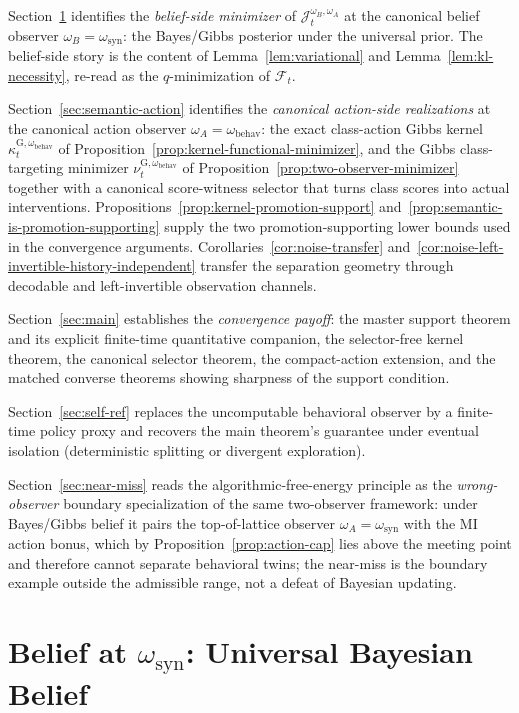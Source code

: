 \documentclass[11pt]{article}
\theoremstyle{definition}
\theoremstyle{remark}
\begin{document}
Section~\ref{sec:belief} identifies the \emph{belief-side minimizer} of $\mathcal J_t^{\omega_B,\omega_A}$ at the canonical belief observer $\omega_B=\omega_{\mathrm{syn}}$: the Bayes/Gibbs posterior under the universal prior. The belief-side story is the content of Lemma~\ref{lem:variational} and Lemma~\ref{lem:kl-necessity}, re-read as the $q$-minimization of $\mathcal F_t$.

Section~\ref{sec:semantic-action} identifies the \emph{canonical action-side realizations} at the canonical action observer $\omega_A=\omega_{\mathrm{behav}}$: the exact class-action Gibbs kernel $\kappa_t^{\mathrm G,\omega_{\mathrm{behav}}}$ of Proposition~\ref{prop:kernel-functional-minimizer}, and the Gibbs class-targeting minimizer $\nu_t^{\mathrm G,\omega_{\mathrm{behav}}}$ of Proposition~\ref{prop:two-observer-minimizer} together with a canonical score-witness selector that turns class scores into actual interventions. Propositions~\ref{prop:kernel-promotion-support} and~\ref{prop:semantic-is-promotion-supporting} supply the two promotion-supporting lower bounds used in the convergence arguments. Corollaries~\ref{cor:noise-transfer} and~\ref{cor:noise-left-invertible-history-independent} transfer the separation geometry through decodable and left-invertible observation channels.

Section~\ref{sec:main} establishes the \emph{convergence payoff}: the master support theorem and its explicit finite-time quantitative companion, the selector-free kernel theorem, the canonical selector theorem, the compact-action extension, and the matched converse theorems showing sharpness of the support condition.

Section~\ref{sec:self-ref} replaces the uncomputable behavioral observer by a finite-time policy proxy and recovers the main theorem's guarantee under eventual isolation (deterministic splitting or divergent exploration).

Section~\ref{sec:near-miss} reads the algorithmic-free-energy principle as the \emph{wrong-observer} boundary specialization of the same two-observer framework: under Bayes/Gibbs belief it pairs the top-of-lattice observer $\omega_A=\omega_{\mathrm{syn}}$ with the MI action bonus, which by Proposition~\ref{prop:action-cap} lies above the meeting point and therefore cannot separate behavioral twins; the near-miss is the boundary example outside the admissible range, not a defeat of Bayesian updating.

\section{Belief at $\omega_{\mathrm{syn}}$: Universal Bayesian Belief}
\label{sec:belief}
\end{document}
